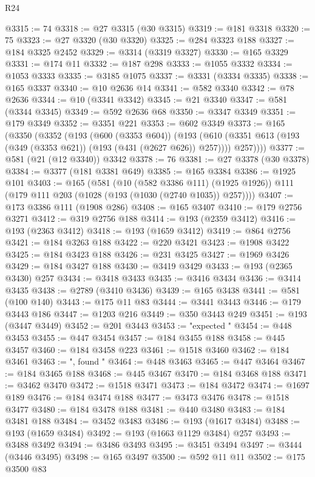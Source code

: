 \begin{lexlean}{R24}
\begin{coremodule}
@3315 := 74
@3318 := @27 @3315 (@30 @3315)
@3319 := @181 @3318
@3320 := 75
@3323 := @27 @3320 (@30 @3320)
@3325 := @284 @3323 @188
@3327 := @184 @3325 @2452
@3329 := @3314 (@3319 @3327)
@3330 := @165 @3329
@3331 := @174 @11
@3332 := @187 @298
@3333 := @1055 @3332
@3334 := @1053 @3333
@3335 := @3185 @1075
@3337 := @3331 (@3334 @3335)
@3338 := @165 @3337
@3340 := @10 @2636 @14
@3341 := @582 @3340
@3342 := @78 @2636
@3344 := @10 (@3341 @3342)
@3345 := @21 @3340
@3347 := @581 (@3344 @3345)
@3349 := @592 @2636 @68
@3350 := @3347 @3349
@3351 := @179 @3349
@3352 := @3351 @221
@3353 := @602 @3349
@3373 := @165
    (@3350
      (@3352
        (@193
          (@600 (@3353 @604))
          (@193
            (@610 (@3351 @613 (@193 (@349 (@3353 @621)) (@193 (@431 (@2627 @626)) @257))))
            @257))))
@3377 := @581 (@21 (@12 @3340)) @3342
@3378 := 76
@3381 := @27 @3378 (@30 @3378)
@3384 := @3377 (@181 @3381 @649)
@3385 := @165 @3384
@3386 := @1925 @101
@3403 := @165
    (@581
      (@10 (@582 @3386 @111) (@1925 @1926))
      @111
      (@179 @111 @203 (@1028 (@193 (@1030 (@2740 @1035)) @257))))
@3407 := @173 @3386 @111 (@1908 @286)
@3408 := @165 @3407
@3410 := @179 @2756 @3271
@3412 := @319 @2756 @188
@3414 := @193 (@2359 @3412)
@3416 := @193 (@2363 @3412)
@3418 := @193 (@1659 @3412)
@3419 := @864 @2756
@3421 := @184 @3263 @188
@3422 := @220 @3421
@3423 := @1908 @3422
@3425 := @184 @3423 @188
@3426 := @231 @3425
@3427 := @1969 @3426
@3429 := @184 @3427 @188
@3430 := @3419 @3429
@3433 := @193 (@2365 @3430) @257
@3434 := @3418 @3433
@3435 := @3416 @3434
@3436 := @3414 @3435
@3438 := @2789 (@3410 @3436)
@3439 := @165 @3438
@3441 := @581 (@100 @140)
@3443 := @175 @11 @83
@3444 := @3441 @3443
@3446 := @179 @3443 @186
@3447 := @1203 @216
@3449 := @350 @3443 @249
@3451 := @193 (@3447 @3449)
@3452 := @201 @3443
@3453 := "expected "
@3454 := @448 @3453
@3455 := @447 @3454
@3457 := @184 @3455 @188
@3458 := @445 @3457
@3460 := @184 @3458 @223
@3461 := @1518 @3460
@3462 := @184 @3461
@3463 := ", found "
@3464 := @448 @3463
@3465 := @447 @3464
@3467 := @184 @3465 @188
@3468 := @445 @3467
@3470 := @184 @3468 @188
@3471 := @3462 @3470
@3472 := @1518 @3471
@3473 := @184 @3472
@3474 := @1697 @189
@3476 := @184 @3474 @188
@3477 := @3473 @3476
@3478 := @1518 @3477
@3480 := @184 @3478 @188
@3481 := @440 @3480
@3483 := @184 @3481 @188
@3484 := @3452 @3483
@3486 := @193 (@1617 @3484)
@3488 := @193 (@1659 @3484)
@3492 := @193 (@1663 @1129 @3484) @257
@3493 := @3488 @3492
@3494 := @3486 @3493
@3495 := @3451 @3494
@3497 := @3444 (@3446 @3495)
@3498 := @165 @3497
@3500 := @592 @11 @11
@3502 := @175 @3500 @83

\end{coremodule}
\end{lexlean}
